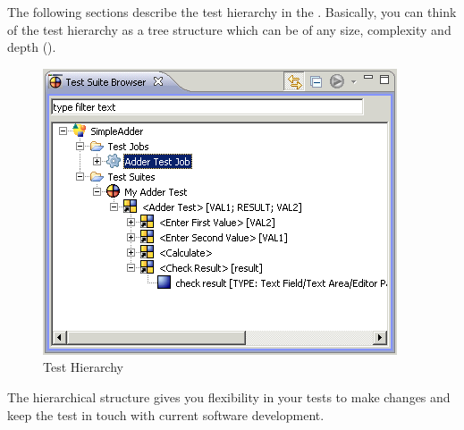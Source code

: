 The following sections describe the test hierarchy in the \ite{}. 
Basically, you can think of the test hierarchy as a tree structure
which can be of any size, complexity and depth
().

\begin{figure}
\begin{center}
\includegraphics{Concepts/PS/treestructure}
\caption{Test Hierarchy}
\label{treestructure}
\end{center}
\end{figure}

The hierarchical structure gives you flexibility in your
tests to make changes and keep the test in touch with current software
development.

